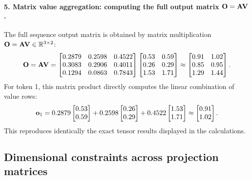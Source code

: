 \documentclass[../../main.tex]{subfiles}
\begin{document}
\paragraph{5. Matrix value aggregation: computing the full output matrix $\mathbf{O} = \mathbf{A} \mathbf{V}$.}
The full sequence output matrix is obtained by matrix multiplication $\mathbf{O} = \mathbf{A} \mathbf{V} \in \mathbb{R}^{3 \times 2}$:
\begin{equation}
\label{eq:full_output_matrix_lecture}
\mathbf{O} = \mathbf{A} \mathbf{V} = \begin{bmatrix}
0.2879 & 0.2598 & 0.4522 \\
0.3083 & 0.2906 & 0.4011 \\
0.1294 & 0.0863 & 0.7843
\end{bmatrix}
\begin{bmatrix}
0.53 & 0.59 \\
0.26 & 0.29 \\
1.53 & 1.71
\end{bmatrix}
\approx \begin{bmatrix}
0.91 & 1.02 \\
0.85 & 0.95 \\
1.29 & 1.44
\end{bmatrix}.
\end{equation}
For token 1, this matrix product directly computes the linear combination of value rows:
\begin{equation}
\mathbf{o}_1 = 0.2879 \begin{bmatrix} 0.53 \\ 0.59 \end{bmatrix} + 0.2598 \begin{bmatrix} 0.26 \\ 0.29 \end{bmatrix} + 0.4522 \begin{bmatrix} 1.53 \\ 1.71 \end{bmatrix} \approx \begin{bmatrix} 0.91 \\ 1.02 \end{bmatrix}.
\end{equation}
This reproduces identically the exact tensor results displayed in the calculations.

\subsection{Dimensional constraints across projection matrices}
\label{subsec:dimensional_constraints}
\end{document}
